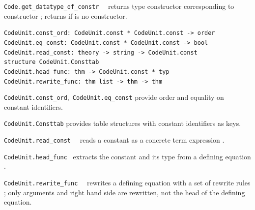 \begin{isabellebody}
\begin{isamarkuptext}
\begin{description}
  \item \verb|Code.get_datatype_of_constr|~~
     returns type constructor corresponding to
     constructor ; returns 
     if  is no constructor.

  \end{description}%
\end{isamarkuptext}%
\isamarkuptrue%
%
\endisatagmlref
{\isafoldmlref}%
%
\isadelimmlref
%
\endisadelimmlref
%
\isamarkuptrue%
%
\isadelimmlref
%
\endisadelimmlref
%
\isatagmlref
%
\begin{isamarkuptext}%
\begin{mldecls}
  \verb|CodeUnit.const_ord: CodeUnit.const * CodeUnit.const -> order| \\
  \verb|CodeUnit.eq_const: CodeUnit.const * CodeUnit.const -> bool| \\
  \verb|CodeUnit.read_const: theory -> string -> CodeUnit.const| \\
  \verb|structure CodeUnit.Consttab| \\
  \verb|CodeUnit.head_func: thm -> CodeUnit.const * typ| \\
  \verb|CodeUnit.rewrite_func: thm list -> thm -> thm| \\
  \end{mldecls}

  \begin{description}

  \item \verb|CodeUnit.const_ord|,~\verb|CodeUnit.eq_const|
     provide order and equality on constant identifiers.

  \item \verb|CodeUnit.Consttab|
     provides table structures with constant identifiers as keys.

  \item \verb|CodeUnit.read_const|~~
     reads a constant as a concrete term expression .

  \item \verb|CodeUnit.head_func|~
     extracts the constant and its type from a defining equation .

  \item \verb|CodeUnit.rewrite_func|~~
     rewrites a defining equation  with a set of rewrite
     rules ; only arguments and right hand side are rewritten,
     not the head of the defining equation.


\end{description}
\end{isamarkuptext}
\end{isabellebody}
